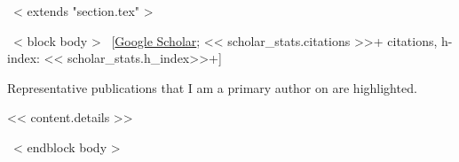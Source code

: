 ~< extends "section.tex" >~

~< block body >~
\vspace{-8.2mm}\hspace{30mm}[\href{https://scholar.google.com/citations?user=<< scholar_id >>}{Google Scholar};
<< scholar_stats.citations >>+ citations, h-index: << scholar_stats.h_index>>+]\vspace{3mm}


Representative publications that I am a primary author on are
\colorbox{tab_highlight}{highlighted.}




<< content.details >>

~< endblock body >~